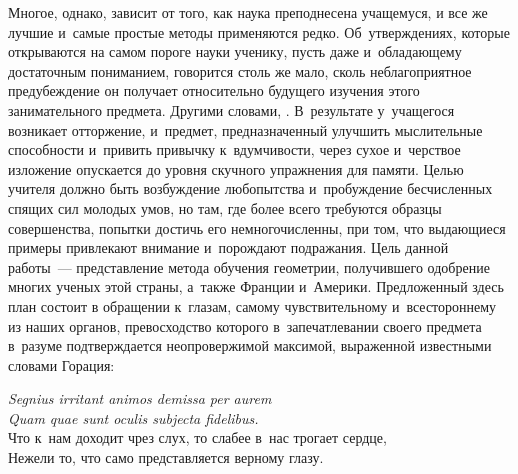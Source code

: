 \documentclass{byrne-book}
\begin{document}
Многое, однако, зависит от того, как наука преподнесена учащемуся, и все же лучшие и~самые простые методы применяются редко. Об~утверждениях, которые открываются на самом пороге науки ученику, пусть даже и~обладающему достаточным пониманием, говорится столь же мало, сколь неблагоприятное  предубеждение он получает относительно будущего изучения этого занимательного предмета. Другими словами, . В~результате у~учащегося возникает отторжение, и~предмет, предназначенный улучшить мыслительные способности и~привить привычку к~вдумчивости, через сухое и~черствое изложение опускается до уровня скучного упражнения для памяти. Целью учителя должно быть возбуждение любопытства и~пробуждение бесчисленных спящих сил молодых умов, но там, где более всего требуются образцы совершенства, попытки достичь его немногочисленны, при том, что выдающиеся примеры привлекают внимание и~порождают подражания. Цель данной работы~— представление метода обучения геометрии, получившего одобрение многих ученых этой страны, а~также Франции и~Америки. Предложенный здесь план состоит в обращении к~глазам, самому чувствительному и~всестороннему из наших органов, превосходство которого в~запечатлевании своего предмета в~разуме подтверждается неопровержимой максимой, выраженной известными словами Горация:

\vfill

\begin{center}
\emph{Segnius irritant animos demissa per aurem\\
Quam quae sunt oculis subjecta fidelibus.}\\
Что к~нам доходит чрез слух, то слабее в~нас трогает сердце,\\
Нежели то, что само представляется верному глазу. %
\end{center}
\end{document}
